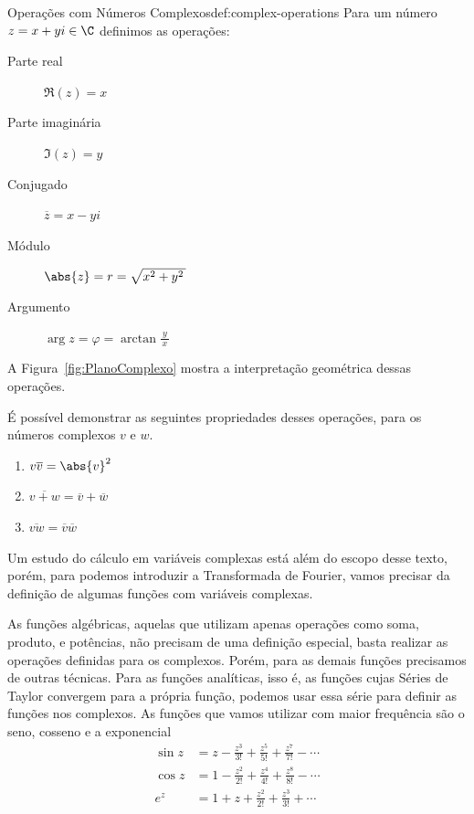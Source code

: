 \begin{definicao}{Operações com Números Complexos}{def:complex-operations}
  Para um número \( z = x+yi \in \C \) definimos as operações:
  \begin{description}
  \item[Parte real]       \tabto{35mm} \( \Re(z) = x \)
  \item[Parte imaginária] \tabto{35mm} \( \Im(z) = y \)
  \item[Conjugado]        \tabto{35mm} \( \overline{z} = x - yi \)
  \item[Módulo]           \tabto{35mm} \( \abs{z} = r = \sqrt{x^2+y^2\,} \)
  \item[Argumento]        \tabto{35mm} \( \arg{z} = \varphi = \arctan\frac{y}{\,x\,}\)
  \end{description}
\end{definicao}
A Figura~\ref{fig:PlanoComplexo} mostra a interpretação geométrica dessas operações.

É possível demonstrar as seguintes propriedades desses operações, para os números
complexos $v$ e $w$.
\begin{enumerate}[label=\alph*)]
\item \( v\overline{v}  = \abs{v}^2 \)
\item \( \overline{v+w} = \overline{v} + \overline{w} \)
\item \( \overline{vw}  = \overline{v}\overline{w} \)
\end{enumerate}

Um estudo do cálculo em variáveis complexas está além do escopo desse texto,
porém, para podemos introduzir a Transformada de Fourier, vamos precisar da definição de algumas
funções com variáveis complexas.

As funções algébricas, aquelas que utilizam apenas operações como soma, produto, e potências,
não precisam de uma definição especial, basta realizar as operações definidas para os complexos.
Porém, para as demais funções precisamos de outras técnicas. Para as funções analíticas,
isso é, as funções cujas Séries de Taylor convergem para a própria função, podemos usar essa série
para definir as funções nos complexos. As funções que vamos utilizar com maior frequência
são o seno, cosseno e a exponencial
\begin{align}
	\sin z & = z - \frac{z^3}{3!} + \frac{z^5}{5!} + \frac{z^7}{7!} - \cdots      \\[3mm]
	\cos z & = 1 - \frac{z^2}{2!} + \frac{z^4}{4!} + \frac{z^8}{8!} - \cdots      \\[3mm]
	e^z    & = 1 + z + \frac{z^2}{2!} + \frac{z^3}{3!} +  \cdots
\end{align}

